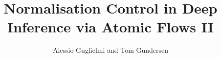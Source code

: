 \documentclass[a4paper,11pt]{article}
\author{Alessio Guglielmi and Tom Gundersen}
\title{Normalisation Control in Deep Inference via Atomic Flows II}
\begin{document}


\maketitle









\small

\end{document}
